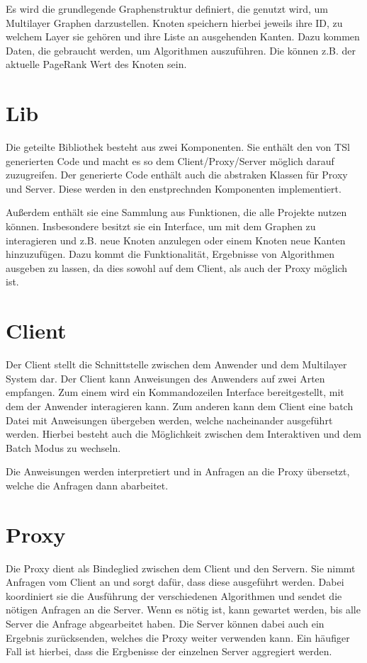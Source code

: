 Es wird die grundlegende Graphenstruktur definiert, die genutzt wird, um Multilayer Graphen darzustellen. Knoten speichern hierbei jeweils ihre ID, zu welchem Layer sie gehören
und ihre Liste an ausgehenden Kanten. Dazu kommen Daten, die gebraucht werden, um Algorithmen auszuführen. Die können z.B. der aktuelle PageRank Wert des Knoten sein.


\section{Lib}

Die geteilte Bibliothek besteht aus zwei Komponenten. Sie enthält den von TSl generierten Code und macht es so dem Client/Proxy/Server möglich darauf zuzugreifen. Der generierte Code enthält auch die abstraken Klassen für Proxy und Server. Diese werden in den enstprechnden Komponenten implementiert. 

Außerdem enthält sie eine Sammlung aus Funktionen, die alle Projekte nutzen können. Insbesondere besitzt sie ein Interface, um mit dem Graphen zu interagieren und z.B. neue Knoten anzulegen oder einem Knoten neue Kanten hinzuzufügen.
Dazu kommt die Funktionalität, Ergebnisse von Algorithmen ausgeben zu lassen, da dies sowohl auf dem Client, als auch der Proxy möglich ist.


\section{Client}

Der Client stellt die Schnittstelle zwischen dem Anwender und dem Multilayer System dar. Der Client kann Anweisungen des Anwenders auf zwei Arten empfangen.
Zum einem wird ein Kommandozeilen Interface bereitgestellt, mit dem der Anwender interagieren kann. Zum anderen kann dem Client eine batch Datei mit Anweisungen übergeben werden,
welche nacheinander ausgeführt werden.
Hierbei besteht auch die Möglichkeit zwischen dem Interaktiven und dem Batch Modus zu wechseln.

Die Anweisungen werden interpretiert und in Anfragen an die Proxy übersetzt, welche die Anfragen dann abarbeitet.

\section{Proxy}

Die Proxy dient als Bindeglied zwischen dem Client und den Servern. Sie nimmt Anfragen vom Client an und sorgt dafür, dass diese ausgeführt werden.
Dabei koordiniert sie die Ausführung der verschiedenen Algorithmen und sendet die nötigen Anfragen an die Server. Wenn es nötig ist, kann gewartet werden,
bis alle Server die Anfrage abgearbeitet haben. Die Server können dabei auch ein Ergebnis zurücksenden, welches die Proxy weiter verwenden kann. Ein häufiger Fall
ist hierbei, dass die Ergbenisse der einzelnen Server aggregiert werden.


